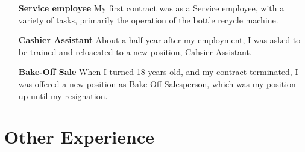 \begin{longtabu}
\begin{itemize}[leftmargin=11em]
        \item[\textbf{Service employee}] My first contract was as a Service employee,
            with a variety of tasks, primarily the operation of the bottle recycle machine.
        \item[\textbf{Cashier Assistant}] About a half year after my employment,
            I was asked to be trained and reloacated to a new position, Cahsier Assistant.
        \item[\textbf{Bake-Off Sale}] When I turned 18 years old, and my contract
            terminated, I was offered a new position as Bake-Off Salesperson, which was my
            position up until my resignation.%
    \end{itemize}
\end{longtabu}

\section*{Other Experience}
\secsep
